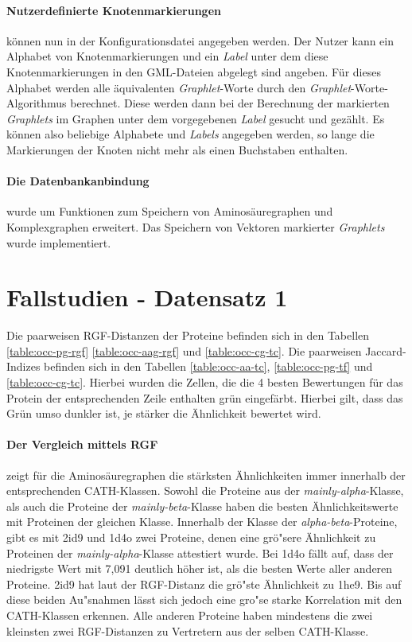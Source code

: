 \documentclass{report}
\begin{document}
\paragraph{Nutzerdefinierte Knotenmarkierungen} k\"onnen nun in der Konfigurationsdatei angegeben werden. Der Nutzer kann ein Alphabet von Knotenmarkierungen und ein \textit{Label} unter dem diese Knotenmarkierungen in den GML-Dateien abgelegt sind angeben. F\"ur dieses Alphabet werden alle \"aquivalenten \textit{Graphlet}-Worte durch den \textit{Graphlet}-Worte-Algorithmus berechnet. Diese werden dann bei der Berechnung der markierten \textit{Graphlets} im Graphen unter dem vorgegebenen \textit{Label} gesucht und gez\"ahlt.
Es k\"onnen also beliebige Alphabete und \textit{Labels} angegeben werden, so lange die Markierungen der Knoten nicht mehr als einen Buchstaben enthalten. 
 

\paragraph{Die Datenbankanbindung} wurde um Funktionen zum Speichern von Aminos\"auregraphen und Komplexgraphen erweitert. Das Speichern von Vektoren markierter \textit{Graphlets} wurde implementiert.



\section{Fallstudien - Datensatz 1}

Die paarweisen RGF-Distanzen der Proteine befinden sich in den Tabellen \ref{table:occ-pg-rgf} \ref{table:occ-aag-rgf} und \ref{table:occ-cg-tc}. Die paarweisen Jaccard-Indizes befinden sich in den Tabellen \ref{table:occ-aa-tc}, \ref{table:occ-pg-tf} und \ref{table:occ-cg-tc}.
Hierbei wurden die Zellen, die die 4 besten Bewertungen f\"ur das Protein der entsprechenden Zeile enthalten gr\"un eingef\"arbt. Hierbei gilt, dass das Gr\"un umso dunkler ist, je st\"arker die \"Ahnlichkeit bewertet wird.

\paragraph{Der Vergleich mittels RGF}
zeigt f\"ur die Aminos\"auregraphen die st\"arksten \"Ahnlichkeiten immer innerhalb der entsprechenden CATH-Klassen. Sowohl die Proteine aus der \textit{mainly-alpha}-Klasse, als auch die Proteine der \textit{mainly-beta}-Klasse haben die besten \"Ahnlichkeitswerte mit Proteinen der gleichen Klasse.
Innerhalb der Klasse der \textit{alpha-beta}-Proteine, gibt es mit 2id9 und 1d4o zwei Proteine, denen eine gr\"o"sere \"Ahnlichkeit zu Proteinen der \textit{mainly-alpha}-Klasse attestiert wurde.
Bei 1d4o f\"allt auf, dass der niedrigste Wert mit 7,091 deutlich h\"oher ist, als die besten Werte aller anderen Proteine.
2id9 hat laut der RGF-Distanz die gr\"o"ste \"Ahnlichkeit zu 1he9.
Bis auf diese beiden Au"snahmen l\"asst sich jedoch eine gro"se starke Korrelation mit den CATH-Klassen erkennen.
Alle anderen Proteine haben mindestens die zwei kleinsten zwei RGF-Distanzen zu Vertretern aus der selben CATH-Klasse.
\end{document}
